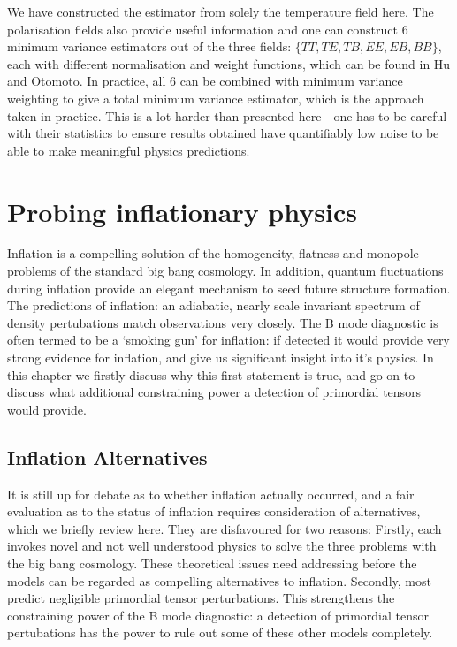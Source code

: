 \documentclass[a4paper,10pt]{article}
\begin{document}
We have constructed the estimator from solely the temperature field here. The polarisation fields also provide useful information and one can construct 6 minimum variance estimators out of the three fields: $\{TT, TE, TB, EE, EB, BB\}$, each with different normalisation and weight functions, which can be found in Hu and Otomoto. In practice, all 6 can be combined with minimum variance weighting to give a total minimum variance estimator, which is the approach taken in practice. This is a lot harder than presented here - one has to be careful with their statistics to ensure results obtained have quantifiably low noise to be able to make meaningful physics predictions.






















\section{Probing inflationary physics}

Inflation is a compelling solution of the homogeneity, flatness and monopole problems of the standard big bang cosmology. In addition, quantum fluctuations during inflation provide an elegant mechanism to seed future structure formation. The predictions of inflation: an adiabatic, nearly scale invariant spectrum of density pertubations match observations very closely. The B mode diagnostic is often termed to be a `smoking gun' for inflation: if detected it would provide very strong evidence for inflation, and give us significant insight into it's physics. In this chapter we firstly discuss why this first statement is true, and go on to discuss what additional constraining power a detection of primordial tensors would provide.

\subsection{Inflation Alternatives}

It is still up for debate as to whether inflation actually occurred, and a fair evaluation as to the status of inflation requires consideration of alternatives, which we briefly  review here. They are disfavoured for two reasons: Firstly, each invokes novel and not well understood physics to solve the three problems with the big bang cosmology. These theoretical issues need addressing before the models can be regarded as compelling alternatives to inflation. Secondly, most predict negligible primordial tensor perturbations. This strengthens the constraining power of the B mode diagnostic: a detection of primordial tensor pertubations has the power to rule out some of these other models completely. \\
\end{document}

